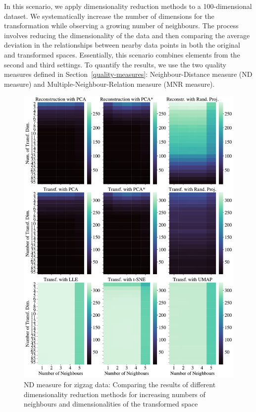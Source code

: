 \documentclass[pdftex,12pt,a4paper]{report}
\begin{document}
In this scenario, we apply dimensionality reduction methods to a 100-dimensional dataset.
We systematically increase the number of dimensions for the transformation while observing a growing number of neighbours.
The process involves reducing the dimensionality of the data and then comparing the average deviation in the relationships between nearby data points in both the original and transformed spaces. Essentially, this scenario combines elements from the second and third settings.
To quantify the results, we use the two quality measures defined in Section~\ref{quality-measures}: Neighbour-Distance measure (ND measure) and Multiple-Neighbour-Relation measure (MNR measure).

\begin{figure}[htb!]
    \includegraphics*[width= \textwidth]{images/multiple_runs/zigzag/dyn_low_dim_vs_num_neigh/euclidean/all_methods_10runs_5lines_100points_5neighbours.pdf}
    \caption{ND measure for zigzag data: Comparing the results of different dimensionality reduction methods for increasing numbers of neighbours and dimensionalities of the transformed space} \label{fig:dyn_low_dim_vs_num_neigh_zigzag}
\end{figure}
\end{document}
